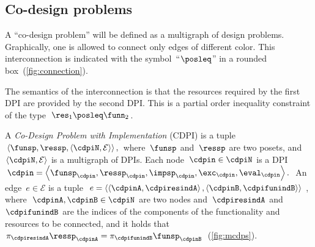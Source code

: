 \subsection{Co-design problems\label{sec:Co-design-problems}}

A ``co-design problem'' will be defined as a multigraph of design
problems. Graphically, one is allowed to connect only edges of different
color. This interconnection is indicated with the symbol~``$\posleq$''
in a rounded box~(\cref{fig:connection}). 


\noindent The semantics of the interconnection is that the resources
required by the first DPI are provided by the second DPI. This is
a partial order inequality constraint of the type~$\res_{1}\posleq\funn_{2}$.

\begin{definition}
\label{def:cdpi}A \emph{Co-Design Problem with Implementation} (CDPI)
is a tuple $\left\langle \funsp,\ressp,\left\langle \cdpiN,\mathcal{E}\right\rangle \right\rangle ,$
where~$\funsp$ and~$\ressp$ are two posets, and~$\left\langle \cdpiN,\mathcal{E}\right\rangle $
is a\emph{ }multigraph of DPIs. Each node~$\cdpin\in\cdpiN$ is a
DPI $\cdpin=\left\langle \funsp_{\cdpin},\ressp_{\cdpin},\impsp_{\cdpin},\exc_{\cdpin},\eval_{\cdpin}\right\rangle .$
An edge~$e\in\mathcal{E}$ is a tuple $e=\left\langle \left\langle \cdpinA,\cdpiresindA\right\rangle ,\left\langle \cdpinB,\cdpifunindB\right\rangle \right\rangle $,
where~$\cdpinA,\cdpinB\in\cdpiN$ are two nodes and~$\cdpiresindA$
and~$\cdpifunindB$ are the indices of the components of the functionality
and resources to be connected, and it holds that~$\pi_{\cdpiresindA}\ressp_{\cdpinA}=\pi_{\cdpifunindB}\funsp_{\cdpinB}$~(\cref{fig:mcdps}). 

\end{definition}

